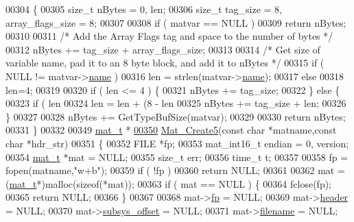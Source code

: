 \begin{DoxyCode}
00304 \{
00305     \textcolor{keywordtype}{size\_t} nBytes = 0, len;
00306     \textcolor{keywordtype}{size\_t} tag\_size = 8, array\_flags\_size = 8;
00307 
00308     \textcolor{keywordflow}{if} ( matvar == NULL )
00309         \textcolor{keywordflow}{return} nBytes;
00310 
00311     \textcolor{comment}{/* Add the Array Flags tag and space to the number of bytes */}
00312     nBytes += tag\_size + array\_flags\_size;
00313 
00314     \textcolor{comment}{/* Get size of variable name, pad it to an 8 byte block, and add it to nBytes */}
00315     \textcolor{keywordflow}{if} ( NULL != matvar->\hyperlink{group___m_a_t_a5d4b55b041e3b4fb50c04337f05ad909}{name} )
00316         len = strlen(matvar->\hyperlink{group___m_a_t_a5d4b55b041e3b4fb50c04337f05ad909}{name});
00317     \textcolor{keywordflow}{else}
00318         len=4;
00319 
00320     \textcolor{keywordflow}{if} ( len <= 4 ) \{
00321         nBytes += tag\_size;
00322     \} \textcolor{keywordflow}{else} \{
00323         \textcolor{keywordflow}{if} ( len %
00324             len = len + (8 - len %
00325         nBytes += tag\_size + len;
00326     \}
00327 
00328     nBytes += GetTypeBufSize(matvar);
00329 
00330     \textcolor{keywordflow}{return} nBytes;
00331 \}
00332 
00349 \hyperlink{struct__mat__t}{mat\_t} *
\hyperlink{mat5_8c_aacff52cdf3427b35a54c111fa3d7bb21}{00350} \hyperlink{mat5_8c_aacff52cdf3427b35a54c111fa3d7bb21}{Mat\_Create5}(\textcolor{keyword}{const} \textcolor{keywordtype}{char} *matname,\textcolor{keyword}{const} \textcolor{keywordtype}{char} *hdr\_str)
00351 \{
00352     FILE *fp;
00353     mat\_int16\_t endian = 0, version;
00354     \hyperlink{struct__mat__t}{mat\_t} *mat = NULL;
00355     \textcolor{keywordtype}{size\_t} err;
00356     time\_t t;
00357 
00358     fp = fopen(matname,\textcolor{stringliteral}{"w+b"});
00359     \textcolor{keywordflow}{if} ( !fp )
00360         \textcolor{keywordflow}{return} NULL;
00361 
00362     mat = (\hyperlink{struct__mat__t}{mat\_t}*)malloc(\textcolor{keyword}{sizeof}(*mat));
00363     \textcolor{keywordflow}{if} ( mat == NULL ) \{
00364         fclose(fp);
00365         \textcolor{keywordflow}{return} NULL;
00366     \}
00367 
00368     mat->\hyperlink{struct__mat__t_a85f562e407ca9ad4d2a6e14f839432b7}{fp}            = NULL;
00369     mat->\hyperlink{struct__mat__t_a5ed5d0e4e3c4d76b626a8a1772d579c4}{header}        = NULL;
00370     mat->\hyperlink{struct__mat__t_a19317c01209959d755d69311960d3eec}{subsys\_offset} = NULL;
00371     mat->\hyperlink{struct__mat__t_a340b191598135edd03b6dec847f0b1b1}{filename}      = NULL;

\end{DoxyCode}

